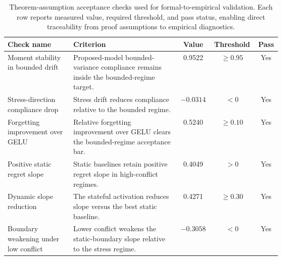 \documentclass{article} %
\begin{document}
\begin{table}[t]
\caption{Theorem-assumption acceptance checks used for formal-to-empirical validation. Each row reports measured value, required threshold, and pass status, enabling direct traceability from proof assumptions to empirical diagnostics.}
\label{tab:theorem_checks}
\centering
\small
\renewcommand{\arraystretch}{1.1}
\setlength{\tabcolsep}{4pt}
\begin{tabular}{p{0.24\linewidth}p{0.39\linewidth}ccc}
\hline
Check name & Criterion & Value & Threshold & Pass \\
\hline
Moment stability in bounded drift & Proposed-model bounded-variance compliance remains inside the bounded-regime target. & 0.9522 & $\ge 0.95$ & Yes \\
Stress-direction compliance drop & Stress drift reduces compliance relative to the bounded regime. & $-0.0314$ & $< 0$ & Yes \\
Forgetting improvement over GELU & Relative forgetting improvement over GELU clears the bounded-regime acceptance bar. & 0.5240 & $\ge 0.10$ & Yes \\
Positive static regret slope & Static baselines retain positive regret slope in high-conflict regimes. & 0.4049 & $>0$ & Yes \\
Dynamic slope reduction & The stateful activation reduces slope versus the best static baseline. & 0.4271 & $\ge 0.30$ & Yes \\
Boundary weakening under low conflict & Lower conflict weakens the static-boundary slope relative to the stress regime. & $-0.3058$ & $<0$ & Yes \\
\hline
\end{tabular}
\end{table}
\end{document}
